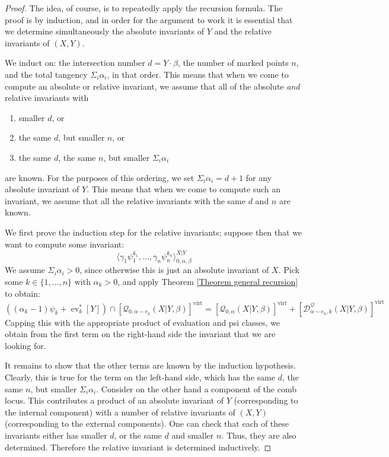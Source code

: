 \documentclass[11pt]{amsart}
\newcommand{\Q}[4]{\mathcal{Q}_{#1,#2}(#3,#4)}
\newcommand{\virt}[1]{[#1]^{\operatorname{virt}}}
\newcommand{\ev}{\operatorname{ev}}
\theoremstyle{definition}
\theoremstyle{definition}
\begin{document}
\begin{proof} The idea, of course, is to repeatedly apply the recursion formula. The proof is by induction, and in order for the argument to work it is essential that we determine simultaneously  the absolute invariants of $Y$ and the relative invariants of $(X,Y)$.

We induct on: the intersection number $d=Y\cdot\beta$, the number of marked points $n$, and the total tangency $\Sigma_i \alpha_i$, in that order. This means that when we come to compute an absolute or relative invariant, we assume that all of the absolute \emph{and} relative invariants with
\begin{enumerate}
\item smaller $d$, or
\item the same $d$, but smaller $n$, or
\item the same $d$, the same $n$, but smaller $\Sigma_i \alpha_i$
\end{enumerate}
are known. For the purposes of this ordering, we set $\Sigma_i \alpha_i = d+1$ for any absolute invariant of $Y$. This means that when we come to compute such an invariant, we assume that all the relative invariants with the same $d$ and $n$ are known.

We first prove the induction step for the relative invariants; suppose then that we want to compute some invariant:
\begin{equation*} \langle \gamma_1 \psi_1^{k_1}, \ldots, \gamma_n \psi_n^{k_n} \rangle_{0,\alpha,\beta}^{X|Y}  \end{equation*}
We assume $\Sigma_i \alpha_i > 0$, since otherwise this is just an absolute invariant of $X$. Pick some $k \in \{1,\ldots,n\}$ with $\alpha_k > 0$, and apply Theorem \ref{Theorem general recursion} to obtain:
\begin{equation*} ((\alpha_k-1) \psi_k + \ev_k^* [Y]) \cap \virt{\Q{0}{\alpha-e_k}{X|Y}{\beta}} = \virt{\Q{0}{\alpha}{X|Y}{\beta}} + \virt{\mathcal D^\mathcal{Q}_{\alpha-e_k,k}(X|Y,\beta)} \end{equation*}
Capping this with the appropriate product of evaluation and psi classes, we obtain from the first term on the right-hand side the invariant that we are looking for.

It remains to show that the other terms are known by the induction hypothesis. Clearly, this is true for the term on the left-hand side, which has the same $d$, the same $n$, but smaller $\Sigma_i \alpha_i$. Consider on the other hand a component of the comb locus. This contributes a product of an absolute invariant of $Y$ (corresponding to the internal component) with a number of relative invariants of $(X,Y)$ (corresponding to the external components). One can check that each of these invariants either has smaller $d$, or the same $d$ and smaller $n$. Thus, they are also determined. Therefore the relative invariant is determined inductively.


\end{proof}
\end{document}
